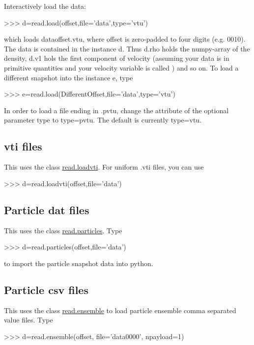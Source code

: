 Interactively load the data\+: 
\begin{DoxyCode}
>>> d=read.load(offset,file='data',type='vtu')  
\end{DoxyCode}
 which loads data\textquotesingle{}offset\textquotesingle{}.vtu, where offset is zero-\/padded to four digits (e.\+g. 0010). The data is contained in the instance {\ttfamily d}. Thus {\ttfamily d.\+rho} holds the numpy-\/array of the density, {\ttfamily d.\+v1} hols the first component of velocity (assuming your data is in primitive quantities and your velocity variable is called \textquotesingle{}) and so on. To load a different snapshot into the instance {\ttfamily e}, type 
\begin{DoxyCode}
>>> e=read.load(DifferentOffset,file='data',type='vtu') 
\end{DoxyCode}
 In order to load a file ending in {\ttfamily .pvtu}, change the attribute of the optional parameter type to {\ttfamily type=\textquotesingle{}pvtu\textquotesingle{}}. The default is currently {\ttfamily type=\textquotesingle{}vtu\textquotesingle{}}.\hypertarget{index_vti}{}\subsection{vti files}\label{index_vti}
This uses the class \hyperlink{classread_1_1loadvti}{read.\+loadvti}. For uniform {\ttfamily .vti} files, you can use 
\begin{DoxyCode}
>>> d=read.loadvti(offset,file='data')
\end{DoxyCode}
\hypertarget{index_particles}{}\subsection{Particle dat files}\label{index_particles}
This uses the class \hyperlink{classread_1_1particles}{read.\+particles}. Type 
\begin{DoxyCode}
>>> d=read.particles(offset,file='data')
\end{DoxyCode}
 to import the particle snapshot data into python.\hypertarget{index_ensemble}{}\subsection{Particle csv files}\label{index_ensemble}
This uses the class \hyperlink{classread_1_1ensemble}{read.\+ensemble} to load particle ensemble comma separated value files. Type 
\begin{DoxyCode}
>>> d=read.ensemble(offset, file='data0000', npayload=1)
\end{DoxyCode}
